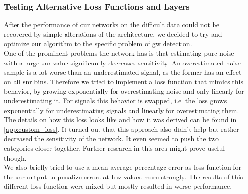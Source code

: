 \subsubsection{Testing Alternative Loss Functions and Layers}
After the performance of our networks on the difficult data could not be recovered by simple alterations of the architecture, we decided to try and optimize our algorithm to the specific problem of \gls{gw} detection.\smallskip\\
One of the prominent problems the network has is that estimating pure noise with a large \gls{snr} value significantly decreases sensitivity. An overestimated noise sample is a lot worse than an underestimated signal, as the former has an effect on all \gls{snr} bins. Therefore we tried to implement a loss function that mimics this behavior, by growing exponentially for overestimating noise and only linearly for underestimating it. For signals this behavior is swapped, i.e. the loss grows exponentially for underestimating signals and linearly for overestimating them. The details on how this loss looks like and how it was derived can be found in \autoref{app:custom_loss}. It turned out that this approach also didn't help but rather decreased the sensitivity of the network. It even seemed to push the two categories closer together. Further research in this area might prove useful though.\smallskip\\
We also briefly tried to use a mean average percentage error as loss function for the \gls{snr} output to penalize errors at low values more strongly. The results of this different loss function were mixed but mostly resulted in worse performance.\medskip\\
